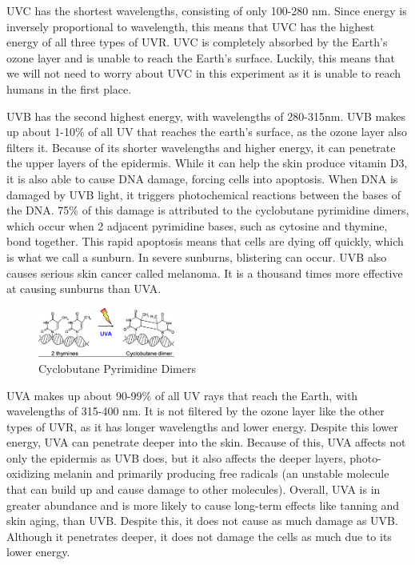 \documentclass{article}
\begin{document}
UVC has the shortest wavelengths, consisting of only 100-280 nm. Since energy is inversely proportional to wavelength, this means that UVC has the highest energy of all three types of UVR. UVC is completely absorbed by the Earth’s ozone layer and is unable to reach the Earth’s surface. Luckily, this means that we will not need to worry about UVC in this experiment as it is unable to reach humans in the first place.


UVB has the second highest energy, with wavelengths of 280-315nm. UVB makes up about 1-10\% of all UV that reaches the earth’s surface, as the ozone layer also filters it. Because of its shorter wavelengths and higher energy, it can penetrate the upper layers of the epidermis. While it can help the skin produce vitamin D3, it is also able to cause DNA damage, forcing cells into apoptosis. When DNA is damaged by UVB light, it triggers photochemical reactions between the bases of the DNA. 75\% of this damage is attributed to the cyclobutane pyrimidine dimers, which occur when 2 adjacent pyrimidine bases, such as cytosine and thymine, bond together. \cite{noauthor_cyclobutane_2020} This rapid apoptosis means that cells are dying off quickly, which is what we call a sunburn. In severe sunburns, blistering can occur. UVB also causes serious skin cancer called melanoma. It is a thousand times more effective at causing sunburns than UVA.

\begin{figure}
  \centering
  \caption{Cyclobutane Pyrimidine Dimers \cite{noauthor_cyclobutane_2020}}
  \includegraphics[width=0.4\textwidth]{CPD.png}
\end{figure}
UVA makes up about 90-99\% of all UV rays that reach the Earth, with wavelengths of 315-400 nm. It is not filtered by the ozone layer like the other types of UVR, as it has longer wavelengths and lower energy. Despite this lower energy, UVA can penetrate deeper into the skin. Because of this, UVA affects not only the epidermis as UVB does, but it also affects the deeper layers, photo-oxidizing melanin and primarily producing free radicals (an unstable molecule that can build up and cause damage to other molecules). Overall, UVA is in greater abundance and is more likely to cause long-term effects like tanning and skin aging, than UVB. Despite this, it does not cause as much damage as UVB. Although it penetrates deeper, it does not damage the cells as much due to its lower energy.
\end{document}
